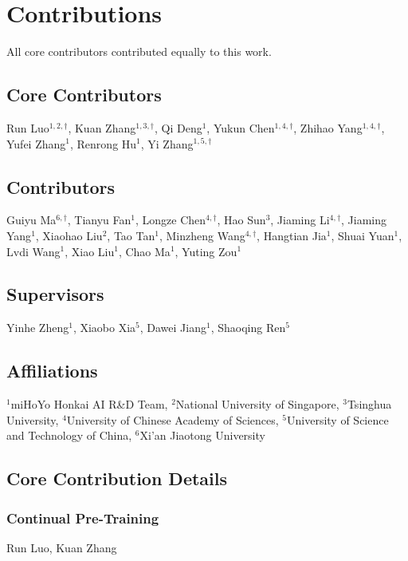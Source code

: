 \renewcommand{\footnoterule}{}


\makeatletter
\begingroup
\renewcommand{\thefootnote}{}
\long{}
\endgroup
\makeatother

\section*{Contributions}
\label{contribution}
All core contributors contributed equally to this work.

\subsection*{Core Contributors}
Run Luo$^{1,2,\dagger}$,
Kuan Zhang$^{1,3,\dagger}$,
Qi Deng$^{1}$,
Yukun Chen$^{1,4,\dagger}$,
Zhihao Yang$^{1,4,\dagger}$,
Yufei Zhang$^{1}$,
Renrong Hu$^{1}$,
Yi Zhang$^{1,5,\dagger}$

\subsection*{Contributors}
Guiyu Ma$^{6,\dagger}$,
Tianyu Fan$^{1}$,
Longze Chen$^{4,\dagger}$,
Hao Sun$^{3}$,
Jiaming Li$^{4,\dagger}$,
Jiaming Yang$^{1}$,
Xiaohao Liu$^{2}$,
Tao Tan$^{1}$,
Minzheng Wang$^{4,\dagger}$,
Hangtian Jia$^{1}$,
Shuai Yuan$^{1}$,
Lvdi Wang$^{1}$,
Xiao Liu$^{1}$,
Chao Ma$^{1}$,
Yuting Zou$^{1}$

\subsection*{Supervisors}
Yinhe Zheng$^1$, Xiaobo Xia$^5$, Dawei Jiang$^1$, Shaoqing Ren$^5$

\subsection*{Affiliations}
$^1$miHoYo Honkai AI R\&D Team,
$^2$National University of Singapore,
$^3$Tsinghua University,
$^4$University of Chinese Academy of Sciences,
$^5$University of Science and Technology of China,
$^6$Xi’an Jiaotong University




\subsection*{Core Contribution Details}
\subsubsection*{Continual Pre-Training}
Run Luo, Kuan Zhang
\vspace{-5pt}
